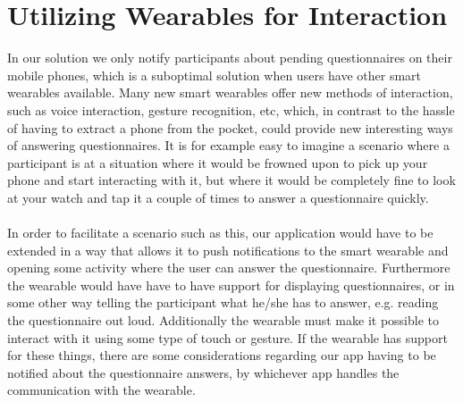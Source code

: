 \section{Utilizing Wearables for Interaction}
\label{sec:utilizing_wearables_for_interaction}

In our solution we only notify participants about pending questionnaires on their mobile phones, which is a suboptimal solution when users have other smart wearables available. Many new smart wearables offer new methods of interaction, such as voice interaction, gesture recognition, etc, which, in contrast to the hassle of having to extract a phone from the pocket, could provide new interesting ways of answering questionnaires. It is for example easy to imagine a scenario where a participant is at a situation where it would be frowned upon to pick up your phone and start interacting with it, but where it would be completely fine to look at your watch and tap it a couple of times to answer a questionnaire quickly. 
\\\\
In order to facilitate a scenario such as this, our application would have to be extended in a way that allows it to push notifications to the smart wearable and opening some activity where the user can answer the questionnaire. Furthermore the wearable would have have to have support for displaying questionnaires, or in some other way telling the participant what he/she has to answer, e.g. reading the questionnaire out loud. Additionally the wearable must make it possible to interact with it using some type of touch or gesture. If the wearable has support for these things, there are some considerations regarding our app having to be notified about the questionnaire answers, by whichever app handles the communication with the wearable. 